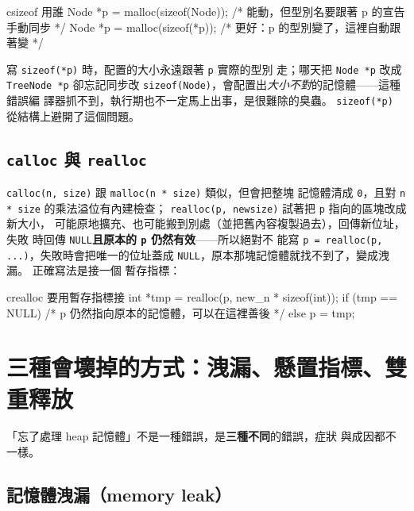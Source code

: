 \begin{code}{c}{sizeof 用誰}
Node *p = malloc(sizeof(Node));   /* 能動，但型別名要跟著 p 的宣告手動同步 */
Node *p = malloc(sizeof(*p));     /* 更好：p 的型別變了，這裡自動跟著變 */
\end{code}

寫 \texttt{sizeof(*p)} 時，配置的大小永遠跟著 \texttt{p} 實際的型別
走；哪天把 \texttt{Node *p} 改成 \texttt{TreeNode *p} 卻忘記同步改
\texttt{sizeof(Node)}，會配置出\textit{大小不對}的記憶體——這種錯誤編
譯器抓不到，執行期也不一定馬上出事，是很難除的臭蟲。 \texttt{sizeof(*p)}
從結構上避開了這個問題。

\subsection{\texttt{calloc} 與 \texttt{realloc}}

\texttt{calloc(n, size)} 跟 \texttt{malloc(n * size)} 類似，但會把整塊
記憶體清成 \texttt{0}，且對 \texttt{n * size} 的乘法溢位有內建檢查；
\texttt{realloc(p, newsize)} 試著把 \texttt{p} 指向的區塊改成新大小，
可能原地擴充、也可能搬到別處（並把舊內容複製過去），回傳新位址，失敗
時回傳 \texttt{NULL}\textbf{且原本的 \texttt{p} 仍然有效}——所以絕對不
能寫 \texttt{p = realloc(p, ...)}，失敗時會把唯一的位址蓋成
\texttt{NULL}，原本那塊記憶體就找不到了，變成洩漏。 正確寫法是接一個
暫存指標：

\begin{code}{c}{realloc 要用暫存指標接}
int *tmp = realloc(p, new_n * sizeof(int));
if (tmp == NULL) {
    /* p 仍然指向原本的記憶體，可以在這裡善後 */
} else {
    p = tmp;
}
\end{code}


\section[三種記憶體錯誤]{三種會壞掉的方式：洩漏、懸置指標、雙重釋放}
\label{sec:ds-memory-bugs}

「忘了處理 heap 記憶體」不是一種錯誤，是\textbf{三種不同}的錯誤，症狀
與成因都不一樣。

\subsection{記憶體洩漏（memory leak）}

